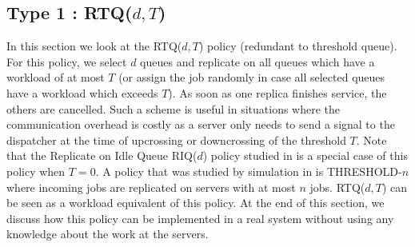 \documentclass[12pt]{report}
\begin{document}
%
\subsection{Type 1 : RTQ($d,T$)}
In this section we look at the RTQ($d,T$) policy (redundant to threshold queue). 
For this policy, we select
$d$ queues and replicate on all queues which have a workload of at most $T$ (or assign the
job randomly in case all selected queues have a workload which exceeds $T$). As soon as one replica finishes service, the others are cancelled. Such a scheme is useful in situations where the
communication overhead is costly as a server only needs to send a signal to the dispatcher at the time of upcrossing or downcrossing of the threshold $T$. Note that the Replicate on Idle Queue RIQ($d$) policy studied in \cite{gardner1} is a special case of this policy when $T=0$. A policy that was
studied by simulation in \cite{gardner1} is THRESHOLD-$n$ where incoming jobs are replicated on servers with at most $n$ jobs. RTQ($d,T$) can be seen as a workload equivalent of this policy. At the end of this section, we discuss how this policy can be implemented in a real system without using any knowledge about the work at the servers.
\end{document}
